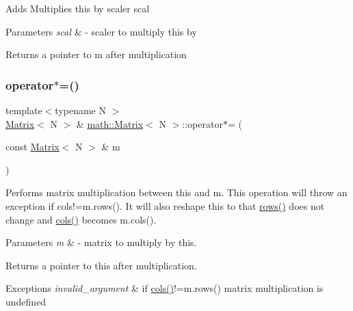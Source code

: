 Adds Multiplies {\ttfamily this} by scaler {\ttfamily scal} 
\begin{DoxyParams}{Parameters}
{\em scal} & -\/ scaler to multiply {\ttfamily this} by \\
\hline
\end{DoxyParams}
\begin{DoxyReturn}{Returns}
a pointer to {\ttfamily m} after multiplication 
\end{DoxyReturn}
\mbox{\label{classmath_1_1Matrix_a4dbf1e0c5f42ce314ea2510a025b7e2a}} 
\subsubsection{\texorpdfstring{operator$\ast$=()}{operator*=()}\hspace{0.1cm}{\footnotesize\ttfamily [2/2]}}
{\footnotesize\ttfamily template$<$typename N $>$ \\
\hyperlink{classmath_1_1Matrix}{Matrix}$<$ N $>$ \& \hyperlink{classmath_1_1Matrix}{math\+::\+Matrix}$<$ N $>$\+::operator$\ast$= (\begin{DoxyParamCaption}\item[{const \hyperlink{classmath_1_1Matrix}{Matrix}$<$ N $>$ \&}]{m }\end{DoxyParamCaption})}

Performs matrix multiplication between {\ttfamily this} and {\ttfamily m}. This operation will throw an exception if {\ttfamily cols!=m.\+rows()}. It will also reshape {\ttfamily this} to that {\ttfamily \hyperlink{classmath_1_1Matrix_a602173645d806afe305ed77b1ff38273}{rows()}} does not change and {\ttfamily \hyperlink{classmath_1_1Matrix_ad78b49e12a607856df124a18a855aaf1}{cols()}} becomes {\ttfamily m.\+cols()}. 
\begin{DoxyParams}{Parameters}
{\em m} & -\/ matrix to multiply by {\ttfamily this}. \\
\hline
\end{DoxyParams}
\begin{DoxyReturn}{Returns}
a pointer to {\ttfamily this} after multiplication. 
\end{DoxyReturn}

\begin{DoxyExceptions}{Exceptions}
{\em invalid\+\_\+argument} & if {\ttfamily \hyperlink{classmath_1_1Matrix_ad78b49e12a607856df124a18a855aaf1}{cols()}!=m.\+rows()} matrix multiplication is undefined \\
\hline
\end{DoxyExceptions}
\mbox{\label{classmath_1_1Matrix_ae2944c1e1a0f1958101db2197bcfaa3c}} 
